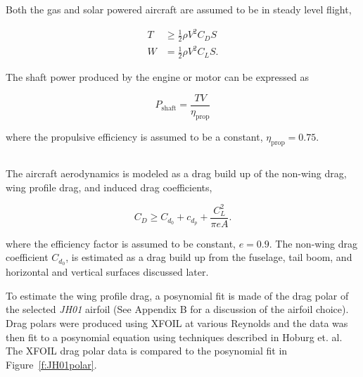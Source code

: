 \DIFdelend Both the gas and solar powered aircraft are assumed to be in steady level flight,\cite{hoburgthesis}

\begin{align}
    \label{e:slfthrust}
    T &\geq \frac{1}{2} \rho V^2 C_D S\\
    \label{e:slfweight}
    W &= \frac{1}{2} \rho V^2 C_L S. 
\end{align}

The shaft power produced by the engine or motor can be expressed as  

\begin{equation}
    \label{e:slfpower}
    P_{\text{shaft}} = \frac{TV}{\eta_{\text{prop}}}
    \end{equation}

    where the propulsive efficiency is assumed to be a constant, $\eta_{\text{prop}} = 0.75$. 

\DIFdelbegin \subsection{}
\addtocounter{subsection}{-1}%
\DIFdelend \DIFaddbegin \subsubsection{}
\DIFaddend 

The aircraft aerodynamics is modeled as a drag build up of the non-wing drag, wing profile drag, and induced drag coefficients, 

\begin{equation}
    \label{e:aerodragb}
    C_D \geq C_{d_0} + c_{d_p} + \frac{C_L^2}{\pi e A}.
    \end{equation}

where the \DIFdelbegin {}\DIFdelend \DIFaddbegin {}\DIFaddend efficiency factor is assumed to be constant, $e=0.9$. 
The non-wing drag coefficient $C_{d_0}$, is estimated as a drag build up from the fuselage, tail boom, and horizontal and vertical surfaces discussed later.

    To estimate the wing profile drag, a posynomial fit is made of the drag polar of the selected \emph{JH01} airfoil (See Appendix B for a discussion of the airfoil choice). 
    Drag polars were produced using XFOIL\cite{xfoil} at various Reynolds and the data was then fit to a posynomial equation using techniques described in Hoburg et. al.\cite{fitting}
    The XFOIL drag polar data is compared to the posynomial fit in Figure~\ref{f:JH01polar}.

